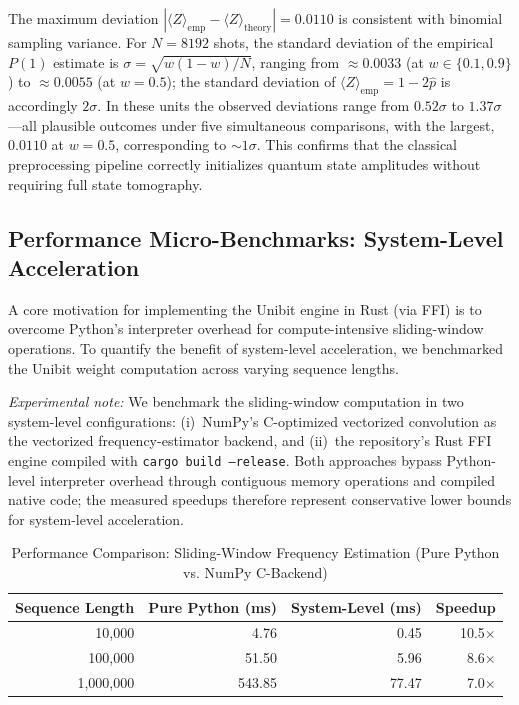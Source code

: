 ﻿\documentclass[12pt,a4paper]{article}
\begin{document}
The maximum deviation $|\langle Z \rangle_{\text{emp}} - \langle Z \rangle_{\text{theory}}| = 0.0110$ is consistent with binomial sampling variance. For $N = 8192$ shots, the standard deviation of the empirical $P(1)$ estimate is $\sigma = \sqrt{w(1-w)/N}$, ranging from $\approx 0.0033$ (at $w \in \{0.1, 0.9\}$) to $\approx 0.0055$ (at $w = 0.5$); the standard deviation of $\langle Z \rangle_{\text{emp}} = 1 - 2\hat{p}$ is accordingly $2\sigma$. In these units the observed deviations range from $0.52\sigma$ to $1.37\sigma$---all plausible outcomes under five simultaneous comparisons, with the largest, $0.0110$ at $w = 0.5$, corresponding to $\sim 1\sigma$. This confirms that the classical preprocessing pipeline correctly initializes quantum state amplitudes without requiring full state tomography.

\subsection{Performance Micro-Benchmarks: System-Level Acceleration}

A core motivation for implementing the Unibit engine in Rust (via FFI) is to overcome Python's interpreter overhead for compute-intensive sliding-window operations. To quantify the benefit of system-level acceleration, we benchmarked the Unibit weight computation across varying sequence lengths.

\textit{Experimental note:} We benchmark the sliding-window computation in two system-level configurations: (i)~NumPy's C-optimized vectorized convolution as the vectorized frequency-estimator backend, and (ii)~the repository's Rust FFI engine compiled with \texttt{cargo build --release}. Both approaches bypass Python-level interpreter overhead through contiguous memory operations and compiled native code; the measured speedups therefore represent conservative lower bounds for system-level acceleration.

\begin{table}[H]
\centering
\caption{Performance Comparison: Sliding-Window Frequency Estimation (Pure Python vs. NumPy C-Backend)}
\label{tab:performance}
\small
\begin{tabular}{@{}rrrr@{}}
\toprule
\textbf{Sequence Length} & \textbf{Pure Python (ms)} & \textbf{System-Level (ms)} & \textbf{Speedup} \\
\midrule
10,000 & 4.76 & 0.45 & 10.5$\times$ \\
100,000 & 51.50 & 5.96 & 8.6$\times$ \\
1,000,000 & 543.85 & 77.47 & 7.0$\times$ \\
\bottomrule
\end{tabular}
\end{table}
\end{document}
